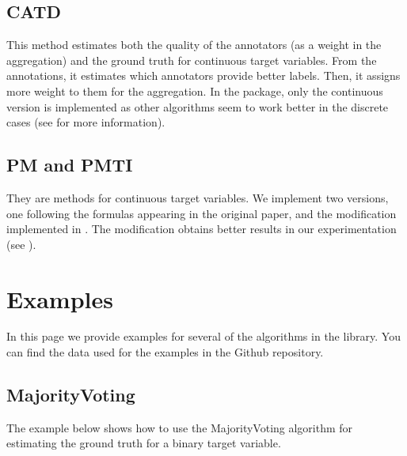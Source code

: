 \documentclass[letterpaper,10pt,english]{sphinxmanual}
\begin{document}
\section{CATD}
\label{\detokenize{package/methods:id7}}
This method estimates both the quality of the annotators (as a weight in the aggregation) and the ground truth
for continuous target variables. From the annotations, it estimates which annotators provide better labels.
Then, it assigns more weight to them for the aggregation. In the package, only
the continuous version is implemented as other algorithms seem to work better in the discrete cases (see  for more information).


\section{PM and PMTI}
\label{\detokenize{package/methods:pm-and-pmti}}
They are methods for continuous target variables. We implement two versions, one following the formulas appearing
in the original paper, and the modification implemented in  . The modification obtains better results in our experimentation 
(see {\hyperref[\detokenize{package/other:comparison}]{}}).


\chapter{Examples}
\label{\detokenize{usage/examples:examples}}\label{\detokenize{usage/examples::doc}}
In this page we provide examples for several of the algorithms in the library.
You can find the data used for the examples in the Github repository.


\section{MajorityVoting}
\label{\detokenize{usage/examples:majorityvoting}}
The example below shows how to use the MajorityVoting algorithm for estimating the ground truth for a binary target variable. 
\end{document}
